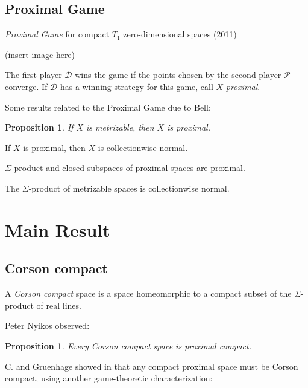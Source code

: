 \documentclass{beamer}
\newtheorem{proposition}[theorem]{Proposition}
\theoremstyle{definition}
\newcommand{\<}{\langle}
\renewcommand{\>}{\rangle}
\newcommand{\pl}[1]{\mathscr{#1}}
\newcommand{\term}{\textit}
\begin{document}
\subsection{Proximal Game}

\begin{frame}
  \term{Proximal Game} {\tiny for compact $T_1$ zero-dimensional spaces} (2011)
  \cite{MR3239205}

  \vspacing

  (insert image here)

  \vpause

  The first player $\pl D$ wins the game if the points chosen by the
  second player $\pl P$ converge. If $\pl D$ has a winning
  strategy for this game, call $X$ \term{proximal}.
\end{frame}

\begin{frame}
  Some results related to the Proximal Game due to Bell:

  \begin{proposition}
    If $X$ is metrizable, then $X$ is proximal.
  \end{proposition}

  \begin{theorem}
    If $X$ is proximal, then $X$ is collectionwise normal.
  \end{theorem}

  \begin{theorem}
    $\Sigma$-product and closed subspaces of proximal spaces are proximal.
  \end{theorem}

  \pause

  \begin{corollary}
    The $\Sigma$-product of metrizable spaces is collectionwise normal.
    \cite{MR0461410} \cite{MR716576}
  \end{corollary}
\end{frame}

\section{Main Result}

\subsection{Corson compact}

\begin{frame}
  A \term{Corson compact} space is a space homeomorphic to a compact
  subset of the $\Sigma$-product of real lines.

  \vpause

  Peter Nyikos observed:

  \begin{proposition}
    Every Corson compact space is proximal compact. \cite{nyikosProximalPreprint}
  \end{proposition}

  \pause

  C. and Gruenhage showed in \cite{MR3227201} that any compact proximal
  space must be Corson compact, using another game-theoretic characterization:
\end{frame}
\end{document}
